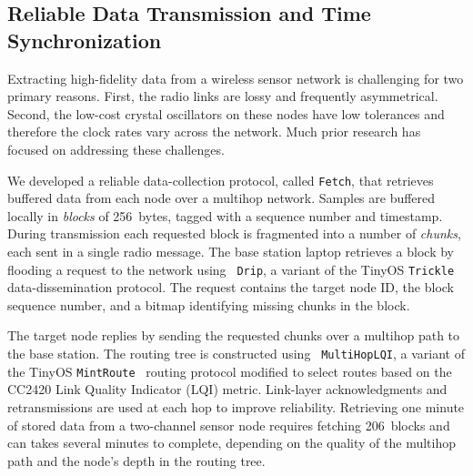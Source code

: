 
\subsection{Reliable Data Transmission and Time Synchronization}

Extracting high-fidelity data from a wireless sensor network is
challenging for two primary reasons.  First, the radio links are lossy
and frequently asymmetrical.  Second, the low-cost crystal oscillators
on these nodes have low tolerances and therefore the clock rates vary
across the network.  Much prior research has focused on addressing
these challenges.



We developed a reliable data-collection protocol, called {\tt Fetch}, that
retrieves buffered data from each node over a multihop network. Samples are
buffered locally in {\em blocks} of 256~bytes, tagged with a sequence number
and timestamp. During transmission each requested block is fragmented into a
number of {\em chunks}, each sent in a single radio message. The base station
laptop retrieves a block by flooding a request to the network using {\tt
Drip}, a variant of the TinyOS {\tt Trickle}~\cite{trickle}
data-dissemination protocol.  The request contains the target node ID, the
block sequence number, and a bitmap identifying missing chunks in the block. 

The target node replies by sending the requested chunks over a multihop path
to the base station.  The routing tree is constructed using {\tt
MultiHopLQI}, a variant of the TinyOS {\tt MintRoute}~\cite{awoo-multihop}
routing protocol modified to select routes based on the CC2420 Link Quality
Indicator (LQI) metric.  Link-layer acknowledgments and retransmissions are
used at each hop to improve reliability.  Retrieving one minute of stored
data from a two-channel sensor node requires fetching 206~blocks and can
takes several minutes to complete, depending on the quality of the multihop
path and the node's depth in the routing tree.

